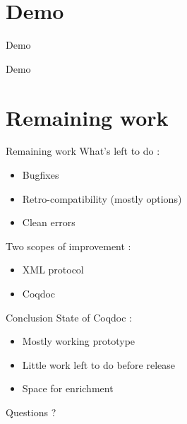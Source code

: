 \documentclass[compress]{beamer}
\begin{document}
\section{Demo}
  \begin{frame}{Demo}
    \begin{center}
      Demo
    \end{center}
  \end{frame}

  \section{Remaining work}
  \begin{frame}{Remaining work}
    What's left to do :
    \begin{itemize}
      \item Bugfixes
      \item Retro-compatibility (mostly options)
      \item Clean errors
    \end{itemize}
    Two scopes of improvement :
    \begin{itemize}
      \item XML protocol
      \item Coqdoc
    \end{itemize}
  \end{frame}

  \begin{frame}{Conclusion}
    State of Coqdoc :
    \begin{itemize}
      \item Mostly working prototype
      \item Little work left to do before release
      \item Space for enrichment %
    \end{itemize}
    \vfill
  \begin{center} \large Questions ? \end{center}
  \end{frame}
\end{document}
